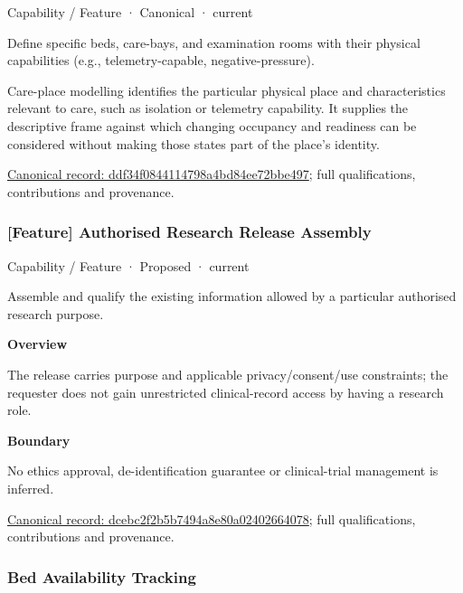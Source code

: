 \label{element:ddf34f0844114798a4bd84ee72bbe497}
{\small Capability / Feature · Canonical · current}\par

Define specific beds, care-bays, and examination rooms with their physical capabilities (e.g., telemetry-capable, negative-pressure).



Care-place modelling identifies the particular physical place and characteristics relevant to care, such as isolation or telemetry capability. It supplies the descriptive frame against which changing occupancy and readiness can be considered without making those states part of the place's identity.


{\footnotesize \href{../../../../continuum/strategy/capability/feature/ddf34f0844114798a4bd84ee72bbe497.md}{Canonical record: ddf34f0844114798a4bd84ee72bbe497}; full qualifications, contributions and provenance.}\par
\subsubsection{[Feature] Authorised Research Release Assembly}

\label{element:dcebc2f2b5b7494a8e80a02402664078}
{\small Capability / Feature · Proposed · current}\par

Assemble and qualify the existing information allowed by a particular authorised research purpose.



\textbf{Overview}



The release carries purpose and applicable privacy/consent/use constraints; the requester does not gain unrestricted clinical-record access by having a research role.



\textbf{Boundary}



No ethics approval, de-identification guarantee or clinical-trial management is inferred.


{\footnotesize \href{../../../../continuum/strategy/capability/feature/dcebc2f2b5b7494a8e80a02402664078.md}{Canonical record: dcebc2f2b5b7494a8e80a02402664078}; full qualifications, contributions and provenance.}\par
\subsubsection{Bed Availability Tracking}

